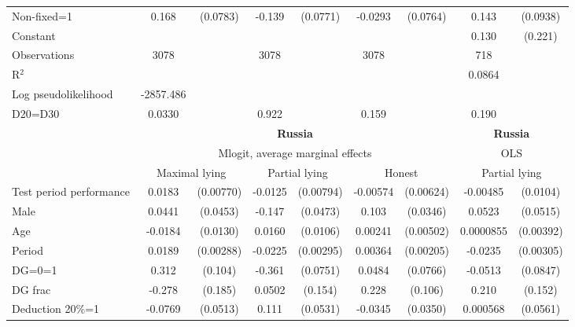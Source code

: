 \begin{tabular}{l|cccccc|cc}
Non-fixed=1     &    0.168\sym{**} & (0.0783)&   -0.139\sym{*}  & (0.0771)&  -0.0293         & (0.0764)&    0.143         & (0.0938)\\
Constant        &                  &         &                  &         &                  &         &    0.130         &  (0.221)\\
\hline
Observations    &     3078         &         &     3078         &         &     3078         &         &      718         &         \\
R$^2$      &                  &         &                  &         &                  &         &        0.0864   &   \\ 
Log pseudolikelihood  & -2857.486   &         &                  &         &                  &         &           &   \\ 
D20=D30         &   0.0330         &         &    0.922         &         &    0.159         &         &    0.190         &         \\
\hline\hline
&\multicolumn{6}{c|}{\bf Russia}&\multicolumn{2}{c}{\bf Russia}\\ &\multicolumn{6}{c|}{Mlogit, average marginal effects }&\multicolumn{2}{c}{OLS}\\
                &\multicolumn{2}{c}{Maximal lying}&\multicolumn{2}{c}{Partial lying}&\multicolumn{2}{c}{Honest}  &\multicolumn{2}{c}{Partial lying}\\
\hline
Test period performance&   0.0183\sym{**} &(0.00770)&  -0.0125         &(0.00794)& -0.00574         &(0.00624)& -0.00485         & (0.0104)\\
Male            &   0.0441         & (0.0453)&   -0.147\sym{***}& (0.0473)&    0.103\sym{***}& (0.0346)&   0.0523         & (0.0515)\\
Age             &  -0.0184         & (0.0130)&   0.0160         & (0.0106)&  0.00241         &(0.00502)&0.0000855         &(0.00392)\\
Period          &   0.0189\sym{***}&(0.00288)&  -0.0225\sym{***}&(0.00295)&  0.00364\sym{*}  &(0.00205)&  -0.0235\sym{***}&(0.00305)\\
DG=0=1          &    0.312\sym{***}&  (0.104)&   -0.361\sym{***}& (0.0751)&   0.0484         & (0.0766)&  -0.0513         & (0.0847)\\
DG frac         &   -0.278         &  (0.185)&   0.0502         &  (0.154)&    0.228\sym{**} &  (0.106)&    0.210         &  (0.152)\\
Deduction 20\%=1&  -0.0769         & (0.0513)&    0.111\sym{**} & (0.0531)&  -0.0345         & (0.0350)& 0.000568         & (0.0561)\\

\end{tabular}
